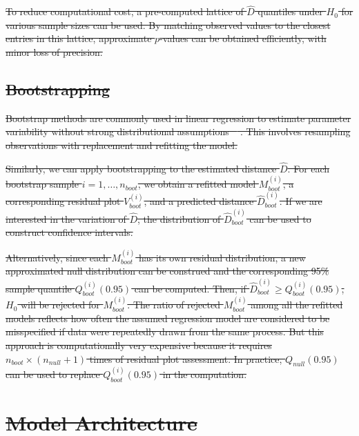 \documentclass[]{interact}
\theoremstyle{plain}%
\theoremstyle{definition}
\theoremstyle{remark}
\providecommand{\DIFaddtex}[1]{{\protect\color{blue}\uwave{#1}}} %
\providecommand{\DIFdeltex}[1]{{\protect\color{red}\sout{#1}}}                      %
\providecommand{\DIFaddbegin}{} %
\providecommand{\DIFaddend}{} %
\providecommand{\DIFdelbegin}{} %
\providecommand{\DIFdelend}{} %
\providecommand{\DIFadd}[1]{\texorpdfstring{\DIFaddtex{#1}}{#1}} %
\providecommand{\DIFdel}[1]{\texorpdfstring{\DIFdeltex{#1}}{}} %
\begin{document}
\DIFdel{To reduce computational cost, a pre-computed lattice of \(\hat{D}\)
quantiles under \(H_0\) for various sample sizes can be used. By
matching observed values to the closest entries in this lattice,
approximate \(p\)-values can be obtained efficiently, with minor loss of
precision.
}%

\DIFdelend \subsection{\DIFdelbegin \DIFdel{Bootstrapping}\DIFdelend \DIFaddbegin \DIFadd{Model Architecture}\DIFaddend }\DIFdelbegin %

\DIFdel{Bootstrap methods are commonly used in linear regression to estimate
parameter variability without strong distributional assumptions
\mbox{%
\citep{davison1997bootstrap, efron1994introduction}}\hskip0pt%
. This involves
resampling observations with replacement and refitting the model.
}%

\DIFdel{Similarly, we can apply bootstrapping to the estimated distance
\(\hat{D}\). For each bootstrap sample \(i = 1, \dots, n_{boot}\), we
obtain a refitted model \(M^{(i)}_{boot}\), a corresponding residual
plot \(V^{(i)}_{boot}\), and a predicted distance
\(\hat{D}^{(i)}_{boot}\). If we are interested in the variation of
\(\hat{D}\), the distribution of \(\hat{D}^{(i)}_{boot}\) can be used to
construct confidence intervals.
}%

\DIFdel{Alternatively, since each \(M_{boot}^{(i)}\) has its own residual
distribution, a new approximated null distribution can be construed and
the corresponding 95\% sample quantile \(Q_{boot}^{(i)}(0.95)\) can be
computed. Then, if \(\hat{D}_{boot}^{(i)} \geq Q_{boot}^{(i)}(0.95)\),
\(H_0\) will be rejected for \(M_{boot}^{(i)}\). The ratio of rejected
\(M_{boot}^{(i)}\) among all the refitted models reflects how often the
assumed regression model are considered to be misspecified if data were
repeatedly drawn from the same process. But this approach is
computationally very expensive because it requires
\(n_{boot} \times (n_{null} + 1)\) times of residual plot assessment. In
practice, \(Q_{null}(0.95)\) can be used to replace
\(Q_{boot}^{(i)}(0.95)\) in the computation.
}%

\section{\DIFdel{Model Architecture}}%
\addtocounter{section}{-1}%
\DIFdelend \label{sec-model-architecture}
\end{document}
